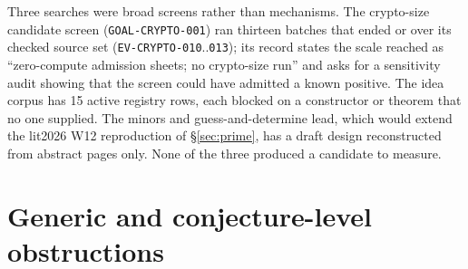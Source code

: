 Three searches were broad screens rather than mechanisms. The crypto-size
candidate screen (\texttt{GOAL-CRYPTO-001}) ran thirteen batches that ended
 or  over
its checked source set (\texttt{EV-CRYPTO-010}..\texttt{013}); its record
states the scale reached as ``zero-compute admission sheets; no crypto-size
run'' and asks for a sensitivity audit showing that the screen could have
admitted a known positive. The idea corpus has 15 active registry rows,
each blocked on a constructor or theorem that no one supplied. The minors
and guess-and-determine lead, which would extend the lit2026 W12
reproduction of \S\ref{sec:prime}, has a draft design reconstructed from
abstract pages only. None of the three produced a candidate to measure.

\section{Generic and conjecture-level obstructions}\label{sec:um-generic}

